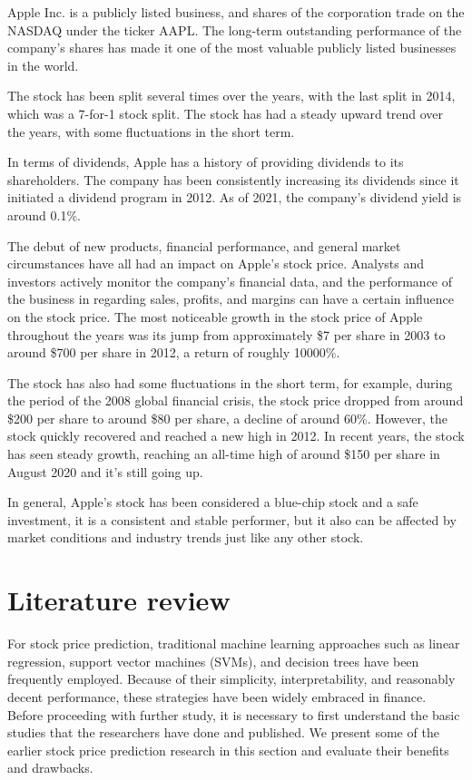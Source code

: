 \documentclass[a4paper]{article}
\begin{document}
Apple Inc. is a publicly listed business, and shares of the corporation trade on the NASDAQ under the ticker AAPL. The long-term outstanding performance of the company's shares has made it one of the most valuable publicly listed businesses in the world.

The stock has been split several times over the years, with the last split in 2014, which was a 7-for-1 stock split. The stock has had a steady upward trend over the years, with some fluctuations in the short term.

In terms of dividends, Apple has a history of providing dividends to its shareholders. The company has been consistently increasing its dividends since it initiated a dividend program in 2012. As of 2021, the company's dividend yield is around 0.1\%.

The debut of new products, financial performance, and general market circumstances have all had an impact on Apple's stock price. Analysts and investors actively monitor the company's financial data, and the performance of the business in regarding sales, profits, and margins can have a certain influence on the stock price. The most noticeable growth in the stock price of Apple throughout the years was its jump from approximately \$7 per share in 2003 to around \$700 per share in 2012, a return of roughly 10000\%.

The stock has also had some fluctuations in the short term, for example, during the period of the 2008 global financial crisis, the stock price dropped from around \$200 per share to around \$80 per share, a decline of around 60\%. However, the stock quickly recovered and reached a new high in 2012. In recent years, the stock has seen steady growth, reaching an all-time high of around \$150 per share in August 2020 and it's still going up.

In general, Apple's stock has been considered a blue-chip stock and a safe investment, it is a consistent and stable performer, but it also can be affected by market conditions and industry trends just like any other stock.
\section{Literature review}
For stock price prediction, traditional machine learning approaches such as linear regression, support vector machines (SVMs), and decision trees have been frequently employed. Because of their simplicity, interpretability, and reasonably decent performance, these strategies have been widely embraced in finance. Before proceeding with further study, it is necessary to first understand the basic studies that the researchers have done and published. We present some of the earlier stock price prediction research in this section and evaluate their benefits and drawbacks.
\end{document}
